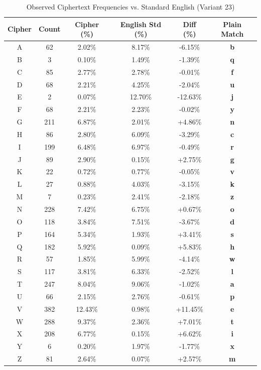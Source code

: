 \documentclass[12pt,a4paper]{article}
\begin{document}
\begin{table}[h!]
\centering
\caption{Observed Ciphertext Frequencies vs. Standard English (Variant 23)}
\label{tab:v23_freq}
\small
\begin{tabular}{|c|c|c|c|c|c|}
\hline
\textbf{Cipher} & \textbf{Count} & \textbf{Cipher (\%)} & \textbf{English Std (\%)} & \textbf{Diff (\%)} & \textbf{Plain Match} \\
\hline
A & 62 & 2.02\% & 8.17\% & -6.15\% & \textbf{b} \\
B & 3 & 0.10\% & 1.49\% & -1.39\% & \textbf{q} \\
C & 85 & 2.77\% & 2.78\% & -0.01\% & \textbf{f} \\
D & 68 & 2.21\% & 4.25\% & -2.04\% & \textbf{u} \\
E & 2 & 0.07\% & 12.70\% & -12.63\% & \textbf{j} \\
F & 68 & 2.21\% & 2.23\% & -0.02\% & \textbf{y} \\
G & 211 & 6.87\% & 2.01\% & +4.86\% & \textbf{n} \\
H & 86 & 2.80\% & 6.09\% & -3.29\% & \textbf{c} \\
I & 199 & 6.48\% & 6.97\% & -0.49\% & \textbf{r} \\
J & 89 & 2.90\% & 0.15\% & +2.75\% & \textbf{g} \\
K & 22 & 0.72\% & 0.77\% & -0.05\% & \textbf{v} \\
L & 27 & 0.88\% & 4.03\% & -3.15\% & \textbf{k} \\
M & 7 & 0.23\% & 2.41\% & -2.18\% & \textbf{z} \\
N & 228 & 7.42\% & 6.75\% & +0.67\% & \textbf{o} \\
O & 118 & 3.84\% & 7.51\% & -3.67\% & \textbf{d} \\
P & 164 & 5.34\% & 1.93\% & +3.41\% & \textbf{s} \\
Q & 182 & 5.92\% & 0.09\% & +5.83\% & \textbf{h} \\
R & 57 & 1.85\% & 5.99\% & -4.14\% & \textbf{w} \\
S & 117 & 3.81\% & 6.33\% & -2.52\% & \textbf{l} \\
T & 247 & 8.04\% & 9.06\% & -1.02\% & \textbf{a} \\
U & 66 & 2.15\% & 2.76\% & -0.61\% & \textbf{p} \\
V & 382 & 12.43\% & 0.98\% & +11.45\% & \textbf{e} \\
W & 288 & 9.37\% & 2.36\% & +7.01\% & \textbf{t} \\
X & 208 & 6.77\% & 0.15\% & +6.62\% & \textbf{i} \\
Y & 6 & 0.20\% & 1.97\% & -1.77\% & \textbf{x} \\
Z & 81 & 2.64\% & 0.07\% & +2.57\% & \textbf{m} \\
\hline
\end{tabular}
\end{table}
\end{document}
